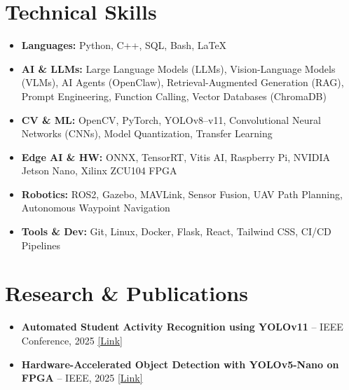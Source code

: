 \documentclass[a4paper,11pt]{article}
\begin{document}
\section*{\color{linkblue}Technical Skills}
\small
\vspace{2pt}
\begin{itemize}[leftmargin=0pt, label={}, itemsep=1.5pt]
    \item \textbf{\color{secondary}Languages:} Python, C++, SQL, Bash, LaTeX
    \item \textbf{\color{secondary}AI \& LLMs:} Large Language Models (LLMs), Vision-Language Models (VLMs), AI Agents (OpenClaw), Retrieval-Augmented Generation (RAG), Prompt Engineering, Function Calling, Vector Databases (ChromaDB)
    \item \textbf{\color{secondary}CV \& ML:} OpenCV, PyTorch, YOLOv8--v11, Convolutional Neural Networks (CNNs), Model Quantization, Transfer Learning
    \item \textbf{\color{secondary}Edge AI \& HW:} ONNX, TensorRT, Vitis AI, Raspberry Pi, NVIDIA Jetson Nano, Xilinx ZCU104 FPGA
    \item \textbf{\color{secondary}Robotics:} ROS2, Gazebo, MAVLink, Sensor Fusion, UAV Path Planning, Autonomous Waypoint Navigation
    \item \textbf{\color{secondary}Tools \& Dev:} Git, Linux, Docker, Flask, React, Tailwind CSS, CI/CD Pipelines
\end{itemize}
\vspace{3pt}

\section*{\color{linkblue}Research \& Publications}
\small
\vspace{2pt}
\begin{itemize}
    \item \textbf{\color{secondary}Automated Student Activity Recognition using YOLOv11} -- IEEE Conference, 2025 \hfill \href{https://ieeexplore.ieee.org/document/11166944}{\color{linkblue}[Link]}
    \item \textbf{\color{secondary}Hardware-Accelerated Object Detection with YOLOv5-Nano on FPGA} -- IEEE, 2025 \hfill \href{https://ieeexplore.ieee.org/document/11300603}{\color{linkblue}[Link]}
\end{itemize}
\end{document}

